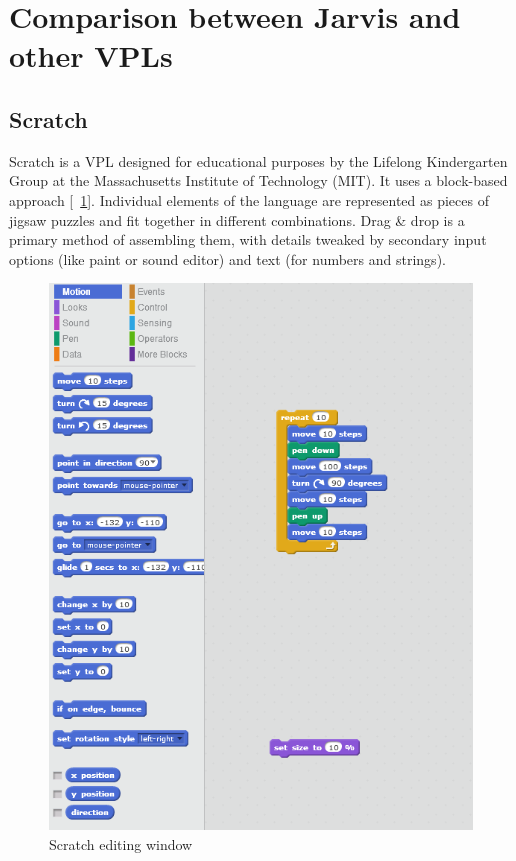 \documentclass[11pt]{scrartcl}
\newcommand*{\figref}[1]{[\textbf{\figurename}~\ref{#1}]}
\begin{document}
\section{Comparison between Jarvis and other VPLs}
\subsection{Scratch}
Scratch is a VPL designed for educational purposes by the Lifelong Kindergarten
Group at the Massachusetts Institute of Technology (MIT).
It uses a block-based approach \figref{fig:scratch}.
Individual elements of the language are represented as pieces of jigsaw puzzles
and fit together in different combinations.
Drag \& drop is a primary method of assembling them, with details tweaked by
secondary input options (like paint or sound editor) and text (for numbers and
strings).

\begin{figure}[hbt]
  \centering
  \includegraphics[scale=0.3]{img/s-puzzle}
  \caption{Scratch editing window}
\label{fig:scratch}
\end{figure}
\end{document}
